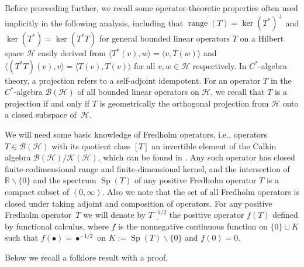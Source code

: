 \documentclass[pdftex]{sigma}
\begin{document}
Before proceeding further, we recall some operator-theoretic properties often
used implicitly in the following analysis, including that $\overline
{\operatorname{range}(T) }=\ker ( T^{\ast} )
^{\perp}$ and $\ker (T^{\ast} ) =\ker ( T^{\ast}T ) $
for general bounded linear operators $T$ on a Hilbert space $\mathcal{H}$
easily derived from $ \langle T^{\ast}(v) ,w \rangle
= \langle v,T(w) \rangle $ and $ \langle (
T^{\ast}T ) (v) ,v \rangle = \langle T (
v ) ,T(v) \rangle $ for all $v,w\in\mathcal{H}$
respectively. In $C^*$-algebra theory, a projection refers to a self-adjoint
idempotent. For an operator $T$ in the $C^*$-algebra $\mathcal{B} (
\mathcal{H} ) $ of all bounded linear operators on $\mathcal{H}$, we
recall that $T$ is a projection if and only if $T$ is geometrically the
orthogonal projection from $\mathcal{H}$ onto a closed subspace of~$\mathcal{H}$.

We will need some basic knowledge of Fredholm operators, i.e., operators
$T\in\mathcal{B} ( \mathcal{H} ) $ with its quotient class $ [
T ] $ an invertible element of the Calkin algebra $\mathcal{B} (
\mathcal{H} ) /\mathcal{K} ( \mathcal{H} ) $, which can be
found in \cite{Do,Mu}. Any such operator has
closed finite-codimensional range and finite-dimensional kernel, and the
intersection of $\mathbb{R}\backslash \{ 0 \} $ and the spectrum
$\operatorname{Sp}(T) $ of any positive Fredholm operator $T$
is a compact subset of $ ( 0,\infty ) $. Also we note that the set
of all Fredholm operators is closed under taking adjoint and composition of operators.
For any positive Fredholm operator~$T$ we will denote by $\underline{T^{-1/2}}$
the positive
operator $f(T) $ defined by functional calculus, where $f$
is the nonnegative continuous function on $ \{ 0 \} \sqcup K$
such that $f ( \bullet ) =\bullet^{-1/2}$ on $K:=\operatorname{Sp}(T) \backslash \{ 0 \} $ and $f (
0 ) =0$.

Below we recall a folklore result with a proof.
\end{document}
